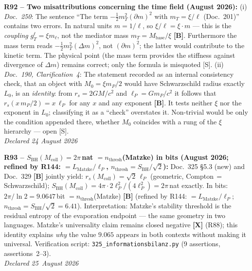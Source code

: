 \medskip
\textbf{R92 -- Two misattributions concerning the time field (August 2026):}
(i) \emph{Doc.~250}: The sentence \enquote{The term $-\tfrac12 m_T^2(\partial m)^2$ with $m_T = \xi/\ell$ (Doc.~201)} contains two errors.
In natural units $m = 1/\ell$, so $\xi/\ell = \xi\cdot m$ --- this is the \emph{coupling} $g_T^\ell = \xi m_\ell$, not the mediator mass $m_T = M_\mathrm{base}/\xi$ \textbf{[B]}.
Furthermore the mass term reads $-\tfrac12 m_T^2(\Delta m)^2$, not $(\partial m)^2$; the latter would contribute to the kinetic term.
The physical point (the mass term provides the stiffness against divergence of $\Delta m$) remains correct; only the formula is misquoted [S].
(ii) \emph{Doc.~190, Clarification~4}: The statement recorded as an internal consistency check, that an object with $M_0 = \xi m_P/2$ would have Schwarzschild radius exactly $L_0$, is an \emph{identity}: from $r_s = 2GM/c^2$ and $\ell_P = G m_P/c^2$ it follows that $r_s(x\,m_P/2) = x\,\ell_P$ for any $x$ and any exponent \textbf{[B]}.
It tests neither $\xi$ nor the exponent in $L_0$; classifying it as a \enquote{check} overstates it. Non-trivial would be only the condition appended there, whether $M_0$ coincides with a rung of the $\xi$ hierarchy --- open [S].\\
\emph{Declared 24 August 2026}

\medskip

\textbf{R93 -- $S_\mathrm{BH}(M_\mathrm{coll}) = 2\pi$\,nat $= n_\mathrm{thresh}$(Matzke) in bits (August 2026; refined by R144: $= L_\mathrm{Matzke}/\ell_P$, $n_\mathrm{thresh} = S_\mathrm{BH}/\sqrt{2}$):}
Doc.~325 §5.3 (new) and Doc.~329 \textbf{[B]} jointly yield:
$r_s(M_\mathrm{coll}) = \sqrt{2}\,\ell_P$ (geometric, Compton\,$=$\,Schwarzschild);
$S_\mathrm{BH}(M_\mathrm{coll}) = 4\pi\cdot 2\ell_P^2/(4\ell_P^2) = 2\pi$\,nat exactly.
In bits: $2\pi/\ln 2 = 9.0647$\,bit $= n_\mathrm{thresh}$(Matzke) \textbf{[B]} (refined by R144: $=L_\mathrm{Matzke}/\ell_P$; $n_\mathrm{thresh}=S_\mathrm{BH}/\sqrt{2}=6.41$).
Interpretation: Matzke's stability threshold is the residual entropy of the
evaporation endpoint --- the same geometry in two languages.
Matzke's universality claim remains closed negative \textbf{[X]} (R88);
this identity explains \emph{why} the value $9.065$ appears in both contexts
without making it universal.
Verification script: \texttt{325\_informationsbilanz.py} (9 assertions, assertions~2--3).\\
\emph{Declared 25~August 2026}

\medskip

